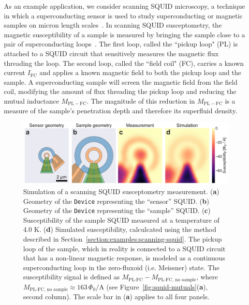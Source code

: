 \documentclass[final,3p,times,twocolumn]{elsarticle}
\newcommand{\inline}[1]{\texttt{#1}\xspace}
\begin{document}
As an example application, we consider scanning SQUID microscopy, a technique in which a superconducting sensor is used to study superconducting or magnetic samples on micron length scales~\cite{Kirtley2016-zz}. In scanning SQUID susceptometry, the magnetic susceptibility of a sample is measured by bringing the sample close to a pair of superconducting loops~\cite{Gardner2001-gr, Huber2008-il, Kirtley_Kalisky_2012}. The first loop, called the ``pickup loop" (PL) is attached to a SQUID circuit that sensitively measures the magnetic flux threading the loop. The second loop, called the ``field coil" (FC), carries a known current $I_\mathrm{FC}$ and applies a known magnetic field to both the pickup loop and the sample. A superconducting sample will screen the magnetic field from the field coil, modifying the amount of flux threading the pickup loop and reducing the mutual inductance $M_\mathrm{PL-FC}$. The magnitude of this reduction in $M_\mathrm{PL-FC}$ is a measure of the sample's penetration depth and therefore its superfluid density.

\begin{figure}
    \centering
    \includegraphics[width=\textwidth]{examples/images/squid-susc-simulation.pdf}
    \caption{Simulation of a scanning SQUID susceptometry measurement. ({\bf a}) Geometry of the \inline{Device} representing the ``sensor'' SQUID. ({\bf b}) Geometry of the \inline{Device} representing the ``sample'' SQUID. ({\bf c}) Susceptibility of the sample SQUID measured at a temperature of 4.0 K. ({\bf d}) Simulated susceptibility, calculcated using the method described in Section~\ref{section:examples:scanning-squid}. The pickup loop of the sample, which in reality is connected to a SQUID circuit that has a non-linear magnetic response, is modeled as a continuous superconducting loop in the zero-fluxoid (i.e. Meissner) state. The susceptibility signal is defined as $M_\text{PL-FC} - M_\text{PL-FC, no sample}$, where $M_\text{PL-FC, no sample}\approx163\,\Phi_0/\mathrm{A}$ (see Figure~\ref{fig:squid-mutuals}({\bf a}), second column). The scale bar in ({\bf a}) applies to all four panels.}
    \label{fig:squid-susc}
\end{figure}
\end{document}
